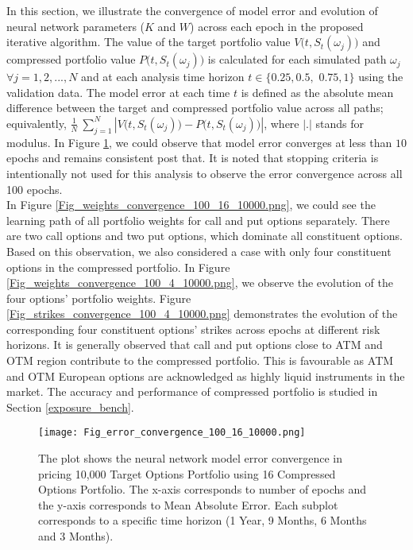 \noindent In this section, we illustrate the convergence of model error and evolution of neural network parameters ($K$ and $W$) across each epoch in the proposed iterative algorithm. The value of the target portfolio value $V\big(t, S_t(\omega_j)\big)$ and compressed portfolio value $P\big(t, S_t(\omega_j)\big)$ is calculated for each simulated path $\omega_j$ $\forall j =1, 2,..., N$ and at each analysis time horizon $t \in \{0.25, 0.5,$ $0.75, 1\}$ using the validation data. The model error at each time $t$ is defined as the absolute mean difference between the target and compressed portfolio value across all paths; equivalently, $ \frac{1}{N} \ \sum_{j=1}^{N} |V\big(t, S_t(\omega_j)\big) - P\big(t, S_t(\omega_j)\big)|$, where $|.|$ stands for modulus. In Figure \ref{Fig_error_convergence_100_16_10000.png}, we could observe that model error converges at less than $10$ epochs and remains consistent post that. It is noted that stopping criteria is intentionally not used for this analysis to observe the error convergence across all 100 epochs. \\

\noindent In Figure \ref{Fig_weights_convergence_100_16_10000.png}, we could see the learning path of all portfolio weights for call and put options separately. There are two call options and two put options, which dominate all constituent options. Based on this observation, we also considered a case with only four constituent options in the compressed portfolio. In Figure \ref{Fig_weights_convergence_100_4_10000.png}, we observe the evolution of the four options' portfolio weights.  Figure \ref{Fig_strikes_convergence_100_4_10000.png} demonstrates the evolution of the corresponding four constituent options' strikes across epochs at different risk horizons. It is generally observed that call and put options close to ATM and OTM region contribute to the compressed portfolio. This is favourable as ATM and OTM European options are acknowledged as highly liquid instruments in the market. The accuracy and performance of compressed portfolio is studied in Section \ref{exposure_bench}.

\begin{figure}[!htb]
\begin{center}
\texttt{[image: Fig\_error\_convergence\_100\_16\_10000.png]}
\caption{ The plot shows the neural network model error convergence in pricing 10,000 Target Options Portfolio using 16 Compressed Options Portfolio. The x-axis corresponds to number of epochs and the y-axis corresponds to Mean Absolute Error. Each subplot corresponds to a specific time horizon (1 Year, 9 Months, 6 Months and 3 Months).}
 \label{Fig_error_convergence_100_16_10000.png}
\end{center}
\end{figure}



